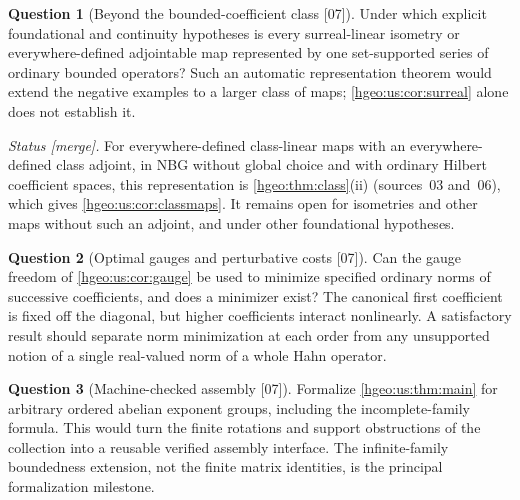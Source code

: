 \documentclass[11pt,letterpaper]{article}
\numberwithin{equation}{section}
\theoremstyle{definition}
\newtheorem{question}[question]{Question}
\theoremstyle{remark}
\newcommand{\src}[1]{\textup{\textsf{\small[#1]}}}
\newcommand{\mergetag}{\textup{\textsf{\small[merge]}}}
\begin{document}
\begin{question}[Beyond the bounded-coefficient class \src{07}]
\label{hgeo:us:q:classmaps}
Under which explicit foundational and continuity hypotheses is every
surreal-linear isometry or everywhere-defined adjointable map represented by
one set-supported series of ordinary bounded operators? Such an automatic
representation theorem would extend the negative examples to a larger class
of maps; \cref{hgeo:us:cor:surreal} alone does not establish it.
\end{question}

\noindent\emph{Status \mergetag.} For everywhere-defined class-linear maps
with an everywhere-defined class adjoint, in NBG without global choice and
with ordinary Hilbert coefficient spaces, this representation is
\cref{hgeo:thm:class}(ii) (sources~03 and~06), which gives
\cref{hgeo:us:cor:classmaps}. It remains open for isometries and other maps
without such an adjoint, and under other foundational hypotheses.

\begin{question}[Optimal gauges and perturbative costs \src{07}]
\label{hgeo:us:q:gauge}
Can the gauge freedom of \cref{hgeo:us:cor:gauge} be used to minimize
specified ordinary norms of successive coefficients, and does a minimizer
exist? The canonical first coefficient is fixed off the diagonal, but higher
coefficients interact nonlinearly. A satisfactory result should separate norm
minimization at each order from any unsupported notion of a single real-valued
norm of a whole Hahn operator.
\end{question}

\begin{question}[Machine-checked assembly \src{07}]\label{hgeo:us:q:lean}
Formalize \cref{hgeo:us:thm:main} for arbitrary ordered abelian exponent
groups, including the incomplete-family formula. This would turn the finite
rotations and support obstructions of the collection into a reusable verified
assembly interface. The infinite-family boundedness extension, not the finite
matrix identities, is the principal formalization milestone.
\end{question}
\end{document}
